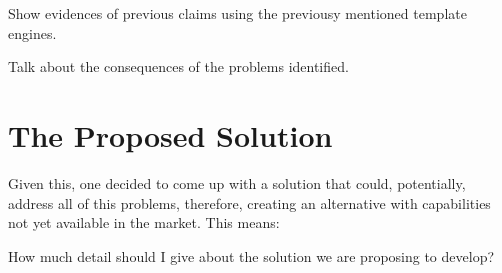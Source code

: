 \begin{expand}
    Show evidences of previous claims using the previousy mentioned template engines.
\end{expand}

\begin{expand}
    Talk about the consequences of the problems identified.
\end{expand}

\section{The Proposed Solution}

Given this, one decided to come up with a solution that could, potentially, address all of this problems, therefore, creating an alternative with capabilities not yet available in the market. This means:


\begin{orientador}
    How much detail should I give about the solution we are proposing to develop?
\end{orientador}